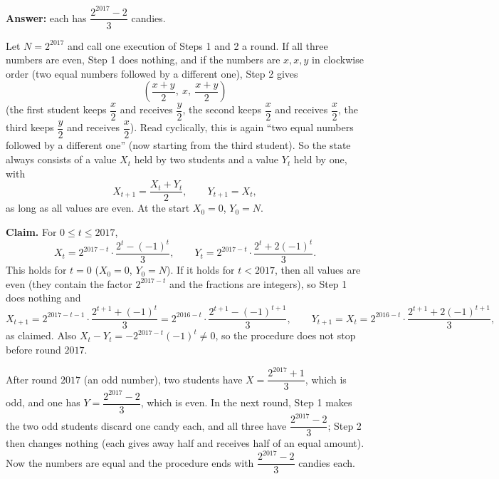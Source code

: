 \textbf{Answer:} each has $\boxed{\dfrac{2^{2017}-2}{3}}$ candies.

Let $N=2^{2017}$ and call one execution of Steps 1 and 2 a round. If all three numbers are even, Step 1 does nothing, and if the numbers are $x,x,y$ in clockwise order (two equal numbers followed by a different one), Step 2 gives
\[
\left(\dfrac{x+y}{2},\ x,\ \dfrac{x+y}{2}\right)
\]
(the first student keeps $\dfrac{x}{2}$ and receives $\dfrac{y}{2}$, the second keeps $\dfrac{x}{2}$ and receives $\dfrac{x}{2}$, the third keeps $\dfrac{y}{2}$ and receives $\dfrac{x}{2}$). Read cyclically, this is again ``two equal numbers followed by a different one'' (now starting from the third student). So the state always consists of a value $X_t$ held by two students and a value $Y_t$ held by one, with
\[
X_{t+1}=\dfrac{X_t+Y_t}{2},\qquad Y_{t+1}=X_t,
\]
as long as all values are even. At the start $X_0=0$, $Y_0=N$.

\textbf{Claim.} For $0\le t\le2017$,
\[
X_t=2^{2017-t}\cdot\dfrac{2^t-(-1)^t}{3},\qquad Y_t=2^{2017-t}\cdot\dfrac{2^t+2(-1)^t}{3}.
\]
This holds for $t=0$ ($X_0=0$, $Y_0=N$). If it holds for $t<2017$, then all values are even (they contain the factor $2^{2017-t}$ and the fractions are integers), so Step 1 does nothing and
\[
X_{t+1}=2^{2017-t-1}\cdot\dfrac{2^{t+1}+(-1)^t}{3}=2^{2016-t}\cdot\dfrac{2^{t+1}-(-1)^{t+1}}{3},\qquad Y_{t+1}=X_t=2^{2016-t}\cdot\dfrac{2^{t+1}+2(-1)^{t+1}}{3},
\]
as claimed. Also $X_t-Y_t=-2^{2017-t}(-1)^t\ne0$, so the procedure does not stop before round $2017$.

After round $2017$ (an odd number), two students have $X=\dfrac{2^{2017}+1}{3}$, which is odd, and one has $Y=\dfrac{2^{2017}-2}{3}$, which is even. In the next round, Step 1 makes the two odd students discard one candy each, and all three have $\dfrac{2^{2017}-2}{3}$; Step 2 then changes nothing (each gives away half and receives half of an equal amount). Now the numbers are equal and the procedure ends with $\dfrac{2^{2017}-2}{3}$ candies each.
